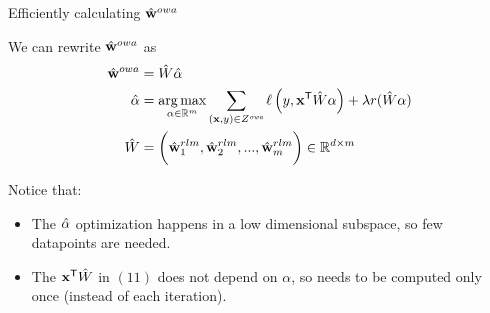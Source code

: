 
\begin{frame}{Efficiently calculating $\hat{\mathbf{w}}^{owa}$}

%

\vspace{0.1in}
We can rewrite $\hat{\mathbf{w}}^{owa}$ as
\begin{align}
\hat{\mathbf{w}}^{owa} &= \hat W \hat\alpha
\\
\label{eq:afull}
\hat\alpha &= \operatorname*{arg\,max}_{\alpha\in\mathbb R^m} \sum _{(\mathbf{x},y)\in Z^{\textit{owa}}} \ell\left(y,{\mathbf{x}}^{\mathsf{T}} \hat W \alpha \right)
+
\lambda r(\hat W\alpha)
\\
\hat W &= \bigg(\hat{\mathbf{w}}^{rlm}_1, \hat{\mathbf{w}}^{rlm}_2, ..., \hat{\mathbf{w}}^{rlm}_m\bigg) \in \mathbb R^{d\times m}
\end{align}

%
%

\pause
Notice that:
\begin{itemize}

\item
The $\hat\alpha$ optimization happens in a low dimensional subspace, so few datapoints are needed.

\pause
\item
The ${\mathbf{x}}^{\mathsf{T}}\hat W$ in $(11)$ does not depend on $\alpha$, so needs to be computed only once (instead of each iteration).

%

\end{itemize}

\end{frame}



